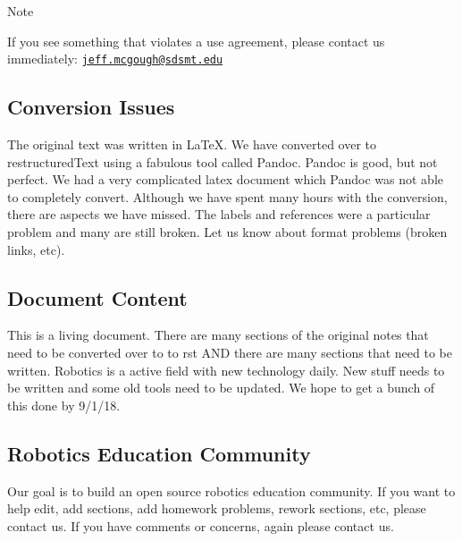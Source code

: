 Note

If you see something that violates a use agreement, please contact us
immediately:
\href{mailto:jeff.mcgough@sdsmt.edu}{\nolinkurl{jeff.mcgough@sdsmt.edu}}

\hypertarget{conversion-issues}{%
\subsection{Conversion Issues}\label{conversion-issues}}

The original text was written in LaTeX. We have converted over to
restructuredText using a fabulous tool called Pandoc. Pandoc is good,
but not perfect. We had a very complicated latex document which Pandoc
was not able to completely convert. Although we have spent many hours
with the conversion, there are aspects we have missed. The labels and
references were a particular problem and many are still broken. Let us
know about format problems (broken links, etc).

\hypertarget{document-content}{%
\subsection{Document Content}\label{document-content}}

This is a living document. There are many sections of the original notes
that need to be converted over to to rst AND there are many sections
that need to be written. Robotics is a active field with new technology
daily. New stuff needs to be written and some old tools need to be
updated. We hope to get a bunch of this done by 9/1/18.

\hypertarget{robotics-education-community}{%
\subsection{Robotics Education
Community}\label{robotics-education-community}}

Our goal is to build an open source robotics education community. If you
want to help edit, add sections, add homework problems, rework sections,
etc, please contact us. If you have comments or concerns, again please
contact us.
